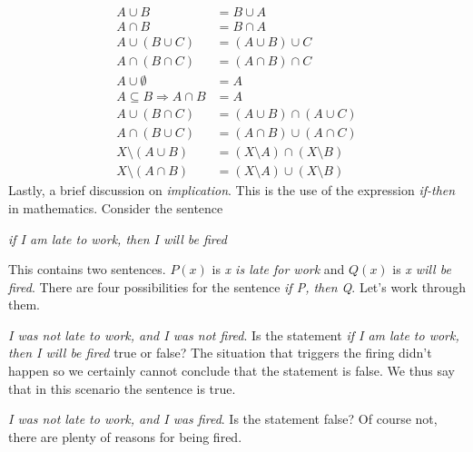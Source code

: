 \documentclass{article}
\theoremstyle{plain}
\theoremstyle{normal}
\begin{document}
        \begin{align}
            A\cup{B}&=B\cup{A}\tag{Commutativity of Unions}\\
            A\cap{B}&=B\cap{A}\tag{Commutativity of Intersections}\\
            A\cup(B\cup{C})&=(A\cup{B})\cup{C}\tag{Associativity of Unions}\\
            A\cap(B\cap{C})&=(A\cap{B})\cap{C}\tag{Associativity of Intersections}\\
            A\cup\emptyset&=A\tag{Identity Law of Unions}\\
            A\subseteq{B}\Rightarrow{A}\cap{B}&=A\tag{Identity Law of Intersections}\\
            A\cup(B\cap{C})&=(A\cup{B})\cap(A\cup{C})\tag{Distributive Law of Unions}\\
            A\cap(B\cup{C})&=(A\cap{B})\cup(A\cap{C})\tag{Distributive Law of Intersections}\\
            X\setminus(A\cup{B})&=(X\setminus{A})\cap(X\setminus{B})\tag{De Morgan's Law of Unions}\\
            X\setminus(A\cap{B})&=(X\setminus{A})\cup(X\setminus{B})\tag{De Morgan's Law of Intersections}
        \end{align}
        Lastly, a brief discussion on \textit{implication}. This is the use
        of the expression \textit{if-then} in mathematics. Consider the sentence
            \begin{center}
                \textit{if I am late to work, then I will be fired}
            \end{center}
            This contains two sentences. $P(x)$ is \textit{x is late for work}
            and $Q(x)$ is \textit{x will be fired}. There are four possibilities
            for the sentence \textit{if P, then Q}. Let's work through them.
            \par\hfill\par
            \textit{I was not late to work, and I was not fired}. Is the
            statement \textit{if I am late to work, then I will be fired}
            true or false? The situation that triggers the firing didn't happen
            so we certainly cannot conclude that the statement is false. We
            thus say that in this scenario the sentence is true.
            \par\hfill\par
            \textit{I was not late to work, and I was fired}. Is the statement
            false? Of course not, there are plenty of reasons for being fired.
\end{document}
